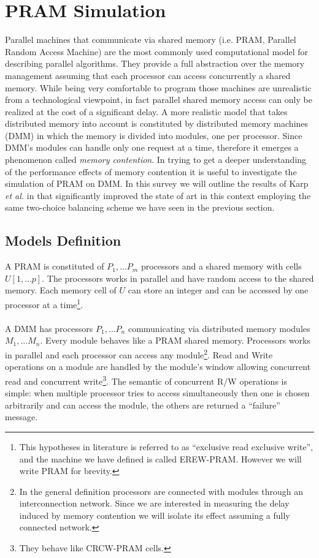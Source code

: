 \section{PRAM Simulation}

Parallel machines that communicate via shared memory
(i.e. PRAM, Parallel Random Access Machine) are the most
commonly used computational model for describing parallel algorithms.
They provide a full abstraction over the memory management assuming
that each processor can access concurrently a shared memory. While being
very comfortable to program those machines are unrealistic from a technological
viewpoint, in fact parallel shared memory access can only be realized at the
cost of a significant delay. A more realistic model that takes distributed
memory into account is constituted by distributed memory machines (DMM) in which
the memory is divided into modules, one per processor. Since DMM's modules can
handle only one request at a time, therefore it emerges a phenomenon
called \textit{memory contention}.
In trying to get a deeper understanding of the performance
effects of memory contention it is useful to investigate the simulation of
 PRAM on DMM. In this survey we will outline the results of Karp {\em et al.} in
 \cite{Karp} that significantly improved the state of art in this context
 employing the same two-choice balancing scheme we have seen in the
 previous section.

 
\subsection{Models Definition}
  A PRAM is constituted of $P_1, \dots P_m$ processors
  and a shared memory with cells $U[1, \dots p]$. The processors
  works in parallel and have random access to the shared memory.
  Each memory cell of $U$ can store an integer and can be accessed
  by one processor at a time\footnote{This hypotheses in literature is referred
    to as ``exclusive read exclusive write'', and the machine we have defined
    is called EREW-PRAM. However we will write PRAM for brevity.}. \\
 \\
  A DMM has processors $P_1, \dots P_n$ communicating via distributed
  memory modules $M_1, \dots M_n$. Every module behaves like a PRAM
  shared memory. Processors works in parallel and each
  processor can access any module\footnote{In the general definition processors
    are connected with modules through an interconnection network. Since we are
    interested in measuring the delay induced by memory contention we will
    isolate its effect assuming a fully connected network.}.
  Read and Write operations on a module are handled by the module's window
  allowing concurrent read and concurrent write\footnote{They
    behave like CRCW-PRAM cells.}. The semantic of concurrent R/W operations
  is simple:
  when multiple processor tries to access simultaneously then one is chosen
  arbitrarily and can access the module, the others are returned a
  ``failure'' message. 

